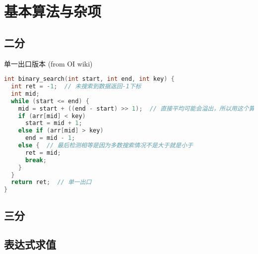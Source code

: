 \section{基本算法与杂项}

\subsection{二分}
\noindent 单一出口版本 (from OI wiki)
\begin{lstlisting}[language=C++]
int binary_search(int start, int end, int key) {
  int ret = -1;  // 未搜索到数据返回-1下标
  int mid;
  while (start <= end) {
    mid = start + ((end - start) >> 1);  // 直接平均可能会溢出，所以用这个算法
    if (arr[mid] < key)
      start = mid + 1;
    else if (arr[mid] > key)
      end = mid - 1;
    else {  // 最后检测相等是因为多数搜索情况不是大于就是小于
      ret = mid;
      break;
    }
  }
  return ret;  // 单一出口
}
\end{lstlisting}
\subsection{三分}
\subsection{表达式求值}

